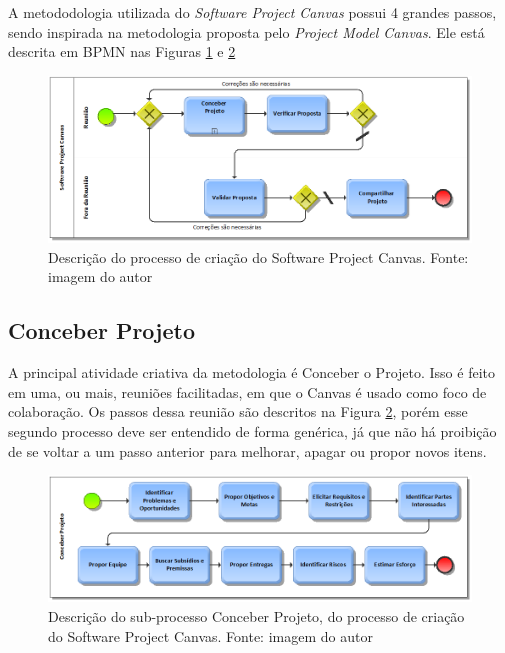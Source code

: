 \documentclass[a4]{report}
\begin{document}
A metododologia utilizada do \textit{Software Project Canvas} possui 4 grandes passos, sendo inspirada na metodologia proposta pelo \textit{Project Model Canvas}. Ele está descrita em BPMN nas Figuras \ref{fig:bpmn1} e \ref{fig:bpmn2}

\begin{figure}[htb]
    \centering
    \includegraphics[width=\textwidth]{imagens/Software Project Canvas - 4 pessos.adf.png}
    \caption{Descrição do processo de criação do Software Project Canvas. Fonte: imagem do autor}
    \label{fig:bpmn1}
\end{figure}

\subsection{Conceber Projeto}

A principal atividade criativa da metodologia é Conceber o Projeto. Isso é feito em uma, ou mais, reuniões facilitadas, em que o Canvas é usado como foco de colaboração. Os passos dessa reunião são descritos na Figura \ref{fig:bpmn2}, porém esse segundo processo deve ser entendido de forma genérica, já que não há proibição de se voltar a um passo anterior para melhorar, apagar ou propor novos itens.

\begin{figure}[htb]
    \centering
    \includegraphics[width=\textwidth]{imagens/Conceber Projeto do Software Project Canvas.png}
    \caption{Descrição do sub-processo Conceber Projeto, do processo de criação do Software Project Canvas. Fonte: imagem do autor}
    \label{fig:bpmn2}
\end{figure}
\end{document}
